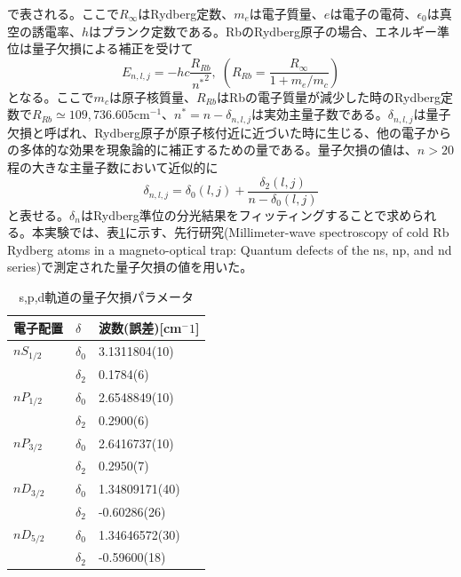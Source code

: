 \documentclass[dvipdfmx]{jsreport}
\begin{document}
で表される。ここで$R_{\infty}$はRydberg定数、$m_e$は電子質量、$e$は電子の電荷、$\epsilon_0$は真空の誘電率、$h$はプランク定数である。RbのRydberg原子の場合、エネルギー準位は量子欠損による補正を受けて
\begin{equation}
 E_{n,l,j} = -hc\frac{R_{Rb}}{{n^*}^2},\; \left( R_{Rb} = \frac{R_{\infty}}{1 + m_e / m_c} \right)
\end{equation}
となる。ここで$m_c$は原子核質量、$R_{Rb}$はRbの電子質量が減少した時のRydberg定数で$R_{Rb} \simeq 109,736.605\text{cm}^{-1}$、${n^*} = n - \delta_{n,l,j}$は実効主量子数である。$\delta_{n,l,j}$は量子欠損と呼ばれ、Rydberg原子が原子核付近に近づいた時に生じる、他の電子からの多体的な効果を現象論的に補正するための量である。量子欠損の値は、$n > 20$程の大きな主量子数において近似的に
\begin{equation}
\delta_{n,l,j} = \delta_0(l,j) + \frac{\delta_2(l,j)}{n - \delta_0(l,j)}
\end{equation}
と表せる。$\delta_n$はRydberg準位の分光結果をフィッティングすることで求められる。本実験では、表\ref{table:qd}に示す、先行研究\cite{quantum-defect}(Millimeter-wave spectroscopy of cold Rb Rydberg atoms in a magneto-optical trap: Quantum defects of the ns, np, and nd series)で測定された量子欠損の値を用いた。
\begin{table}[hbtp]
  \caption{s,p,d軌道の量子欠損パラメータ}
  \label{table:qd}
  \centering
  \begin{tabular}{lll}
    \hline
    電子配置  & $\delta$ & 波数(誤差)[cm$^-1$] \\
    \hline
    \hline
    $nS_{1/2}$  & $\delta_0$ & 3.1311804(10) \\
                        & $\delta_2$ & 0.1784(6) \\
    $nP_{1/2}$  & $\delta_0$ & 2.6548849(10) \\
                        & $\delta_2$ & 0.2900(6) \\
    $nP_{3/2}$  & $\delta_0$ & 2.6416737(10) \\
                     & $\delta_2$ & 0.2950(7) \\
    $nD_{3/2}$  & $\delta_0$ & 1.34809171(40) \\
                        & $\delta_2$ & -0.60286(26) \\
    $nD_{5/2}$  & $\delta_0$ & 1.34646572(30) \\
                        & $\delta_2$ & -0.59600(18) \\
    \hline
  \end{tabular}
\end{table}
\end{document}
